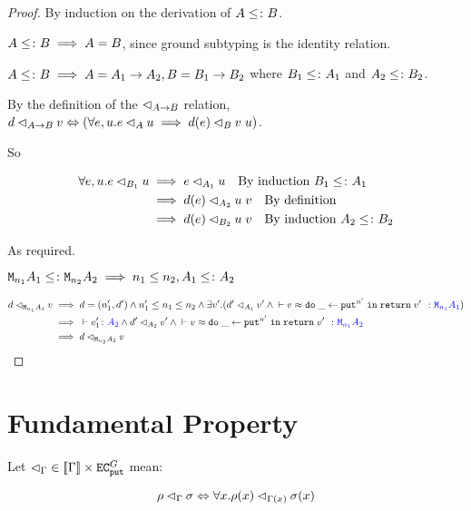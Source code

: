 \documentclass{Report}
\newcommand{\relates}[0]{\lhd}
\newcommand{\logRel}[3]{#1 \relates_{#2} #3}
\newcommand{\zberelation}[3]{\berelation{}{#1}{#2}{#3}}
\newcommand\ztyperelation[2]{\typerelation{}{#1}{#2}}
\renewcommand\put[0]{\texttt{put}}
\newcommand\ecputG[0]{\texttt{EC}_\put^G}
\begin{document}
\begin{proof}
    By induction on the derivation of $A\leq\colon B$.

        $A\leq\colon B\implies A = B$, since ground subtyping is the identity relation.

        $A\leq\colon B\implies A = A_1\rightarrow A_2, B = B_1\rightarrow B_2$ where $B_1\leq\colon A_1$ and $A_2\leq\colon B_2$.

        By the definition of the $\relates_{\ab}$ relation, $\logRel{d}{\ab}{v} \Leftrightarrow (\forall e, u. \logRel{e}{A}{u}\implies \logRel{d(e)}{B}{\apply{v}{u}})$.

        So 

        \begin{align}
            \forall e, u. \logRel{e}{B_1}{u} & \implies \logRel{e}{A_1}{u} \qt{By induction $B_1\subtype A_1$}\\
            & \implies \logRel{d(e)}{A_2}{\apply{u}{v}}\qt{By definition}\\
            & \implies \logRel{d(e)}{B_2}{\apply{u}{v}}\qt{By induction $A_2\subtype B_2$}
        \end{align}

        As required.

    $\texttt{M}_{n_1}{A_1} \leq\colon \texttt{M}_{n_2}{A_2} \implies n_1\leq n_2, A_1\leq\colon A_2$

    \begin{align}
        \logRel{d}{\M{n_1}{A_1}}{v} & \implies  d=(n_1', d') \wedge n_1' \leq n_1\leq n_2 \wedge \exists v'. (\logRel{d'}{A_1}{v'} \wedge\zberelation{v}{\doin{\_}{\put^{n'}}{\return{v'}}}{\M{n_1}{A_1}})\\
        & \implies \ztyperelation{v_1'}{A_2} \wedge \logRel{d'}{A_2}{v'} \wedge \zberelation{v}{\doin{\_}{\put^{n'}}{\return{v'}}}{\M{n_1}{A_2}}\\
        & \implies \logRel{d}{\M{n_2}{A_2}}{v}
    \end{align}
\end{proof}

\section{Fundamental Property}\label{FundProp}
Let $\relates_\G \in \deno{\G}\times \ecputG$ mean:

\begin{equation}
    \label{LogicalRelationTypeEnvironment}
    \logRel{\rho}{\G}{\si} \Leftrightarrow \forall x. \logRel{\rho(x)}{\G(x)}{\si(x)}
\end{equation}
\end{document}
